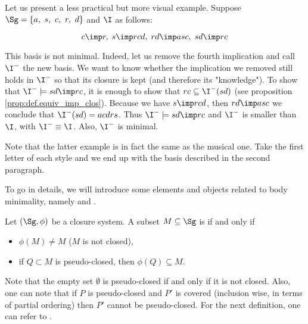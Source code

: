 \vspace{0.5em}

Let us present a less practical but more visual example. Suppose $\Sg = \{ a, 
\  s,\  c, \  r, \  d\}$
and $\I$ as follows:

	\[ c \imp r, \; s \imp rcd, \; rd \imp asc, \; sd \imp rc \]

\noindent This basis is not minimal. Indeed, let us remove the fourth 
implication and call $\I^{-}$ the new basis. We want to know whether the 
implication we removed still holds in $\I^{-}$ so that its closure is kept (and
therefore its "knowledge"). To show that $\I^{-} \models sd \imp rc$, it is
enough to show that $rc \subseteq \I^{-}(sd)$ (see proposition 
\ref{prop:def.equiv_imp_clos}). Because we have $s \imp rcd$, then $rd \imp 
asc$ we conclude that $\I^{-}(sd) = acdrs$. Thus $\I^{-} \models sd \imp rc$ 
and $\I^{-}$ is smaller than $\I$, with $\I^{-} \equiv \I$. Also, $\I^{-}$ is 
minimal.

\vspace{0.5em}

Note that the latter example is in fact the same as the musical one. Take the 
first letter of each style and we end up with the basis described in the second
paragraph.


\vspace{1.2em}

To go in details, we will introduce some elements and objects related to body 
minimality, namely  and .

\begin{definition} Let $(\Sg, \phi)$ be a closure 
system. A subset $M \subseteq \Sg$ is  if and only if 
\begin{itemize}
	\item $\phi(M) \neq M$ ($M$ is not closed),
	\item if $Q \subset M$ is pseudo-closed, then $\phi(Q) \subseteq M$.
\end{itemize}
	
\end{definition}

Note that the empty set $\emptyset$ is pseudo-closed if and only if it is not 
closed. Also, one can note that if $P$ is pseudo-closed and $P'$ is covered
(inclusion wise, in terms of partial ordering) then $P'$ cannot be 
pseudo-closed. For the next definition, one can refer to 
\cite{b._ganter_conceptual_2016, guigues_familles_1986}.


